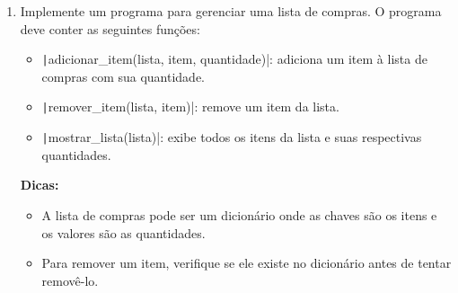 \documentclass[12pt]{article}
\begin{document}
\begin{enumerate}
  \item Implemente um programa para gerenciar uma lista de compras. O programa deve conter as seguintes funções:
    \begin{itemize}
      \item \texttt|adicionar_item(lista, item, quantidade)|: adiciona um item à lista de compras com sua quantidade.
      \item \texttt|remover_item(lista, item)|: remove um item da lista.
      \item \texttt|mostrar_lista(lista)|: exibe todos os itens da lista e suas respectivas quantidades.
    \end{itemize}
    \textbf{Dicas:}
    \begin{itemize}
      \item A lista de compras pode ser um dicionário onde as chaves são os itens e os valores são as quantidades.
      \item Para remover um item, verifique se ele existe no dicionário antes de tentar removê-lo.
    \end{itemize}

    \newpage


\end{enumerate}
\end{document}
